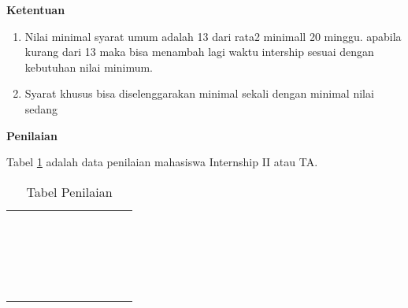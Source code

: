 \textbf {Ketentuan}
\begin{enumerate}
  \item Nilai minimal syarat umum adalah 13 dari rata2 minimall 20 minggu. apabila kurang dari 13 maka bisa menambah lagi waktu intership sesuai dengan kebutuhan nilai minimum.
  \item Syarat khusus bisa diselenggarakan minimal sekali dengan minimal nilai sedang
\end{enumerate}
\textbf{Penilaian}
\par Tabel \ref{table:Penilaian} adalah data penilaian mahasiswa Internship II atau TA.
\begin{table}[!htbp]
\centering
\begin{tabular}{ |c|c|c|c|c|c|c|c|c|c| }
\hline
 &  &  &  &  \\
\hline
 &  &  &  &  \\
\hline
 &  &  &  &  \\
\hline
 &  &  &  &  \\
\hline
 &  &  &  &  \\
\hline
 &  &  &  &  \\
\hline
 &  &  &  &  \\
\hline
 &  &  &  &  \\
\hline
 &  &  &  &  \\
\hline
 &  &  &  &  \\
\hline
 &  &  &  &  \\
\hline
 &  &  &  &  \\
\hline
 &  &  &  &  \\
\hline
 &  &  &  &  \\
\hline
 &  &  &  &  \\
\hline
 &  &  &  &  \\
\hline
 &  &  &  &  \\
\hline
 &  &  &  &  \\
\hline
 &  &  &  &  \\
\hline
 &  &  &  &  \\
\hline
\end{tabular}
\caption{Tabel Penilaian}
\label{table:Penilaian}
\end{table}